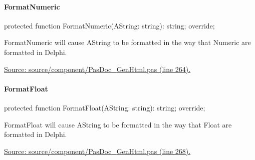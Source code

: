 \documentclass{report}
\newif\ifpdf
\begin{document}
\paragraph*{FormatNumeric}\hspace*{\fill}

\label{PasDoc_GenHtml.TGenericHTMLDocGenerator-FormatNumeric}
\begin{list}{}{
\setlength{\itemindent}{0cm}
\setlength{\listparindent}{0cm}
\setlength{\leftmargin}{\evensidemargin}
\addtolength{\leftmargin}{\tmplength}
\settowidth{\labelsep}{X}
\addtolength{\leftmargin}{\labelsep}
\setlength{\labelwidth}{\tmplength}
}
\item[\textbf{Declaration}\hfill]
\ifpdf
\begin{flushleft}
\fi
\begin{ttfamily}
protected function FormatNumeric(AString: string): string; override;\end{ttfamily}

\ifpdf
\end{flushleft}
\fi

\par
\item[\textbf{Description}]
FormatNumeric will cause AString to be formatted in the way that Numeric are formatted in Delphi.\par
\href{https://github.com/pasdoc/pasdoc/blob/master/source/component/PasDoc_GenHtml.pas#L264}{Source: source/component/PasDoc{\_}GenHtml.pas (line 264).}

\end{list}
\paragraph*{FormatFloat}\hspace*{\fill}

\label{PasDoc_GenHtml.TGenericHTMLDocGenerator-FormatFloat}
\begin{list}{}{
\setlength{\itemindent}{0cm}
\setlength{\listparindent}{0cm}
\setlength{\leftmargin}{\evensidemargin}
\addtolength{\leftmargin}{\tmplength}
\settowidth{\labelsep}{X}
\addtolength{\leftmargin}{\labelsep}
\setlength{\labelwidth}{\tmplength}
}
\item[\textbf{Declaration}\hfill]
\ifpdf
\begin{flushleft}
\fi
\begin{ttfamily}
protected function FormatFloat(AString: string): string; override;\end{ttfamily}

\ifpdf
\end{flushleft}
\fi

\par
\item[\textbf{Description}]
FormatFloat will cause AString to be formatted in the way that Float are formatted in Delphi.\par
\href{https://github.com/pasdoc/pasdoc/blob/master/source/component/PasDoc_GenHtml.pas#L268}{Source: source/component/PasDoc{\_}GenHtml.pas (line 268).}

\end{list}
\end{document}
